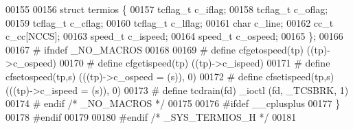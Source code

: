 \begin{DoxyCode}
00155 
00156 \textcolor{keyword}{struct }termios \{
00157   tcflag\_t  c_iflag;
00158   tcflag\_t  c_oflag;
00159   tcflag\_t  c_cflag;
00160   tcflag\_t  c_lflag;
00161   \textcolor{keywordtype}{char}      c_line;
00162   cc\_t      c_cc[NCCS];
00163   speed\_t   c_ispeed;
00164   speed\_t   c_ospeed;
00165 \};
00166 
00167 \textcolor{preprocessor}{# ifndef \_NO\_MACROS}
00168 
00169 \textcolor{preprocessor}{#  define cfgetospeed(tp) ((tp)->c\_ospeed)}
00170 \textcolor{preprocessor}{#  define cfgetispeed(tp) ((tp)->c\_ispeed)}
00171 \textcolor{preprocessor}{#  define cfsetospeed(tp,s) (((tp)->c\_ospeed = (s)), 0)}
00172 \textcolor{preprocessor}{#  define cfsetispeed(tp,s) (((tp)->c\_ispeed = (s)), 0)}
00173 \textcolor{preprocessor}{#  define tcdrain(fd)   \_ioctl (fd, \_TCSBRK, 1)}
00174 \textcolor{preprocessor}{# endif }\textcolor{comment}{/* \_NO\_MACROS */}\textcolor{preprocessor}{}
00175 
00176 \textcolor{preprocessor}{#ifdef \_\_cplusplus}
00177 \}
00178 \textcolor{preprocessor}{#endif}
00179  
00180 \textcolor{preprocessor}{#endif  }\textcolor{comment}{/* \_SYS\_TERMIOS\_H */}\textcolor{preprocessor}{}
00181 
\end{DoxyCode}
